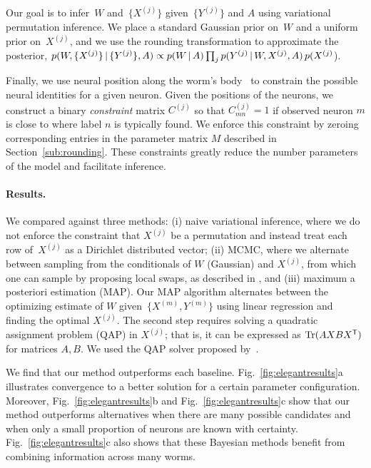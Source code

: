\documentclass[twoside]{article}
\begin{document}
Our goal is to infer~$W$ and~$\{X^{(j)}\}$ given~$\{Y^{(j)}\}$ and $A$ using
variational permutation inference.  We place a standard Gaussian prior
on~$W$ and a uniform prior on~$X^{(j)}$, and we use the rounding
transformation to approximate the posterior,
$p(W,\{X^{(j)}\} \, | \, \{Y^{(j)}\}, A)\propto p(W \, | \, A) \prod_j p(Y^{(j)}
\, | \, W, {X^{(j)}}, A) \, p({X^{(j)}}$).

Finally, we use neural position along the worm's body~\citep{wormatlas} to constrain the
possible neural identities for a given neuron.  Given the positions of the
neurons, we construct a binary \textit{constraint} matrix $C^{(j)}$
so that $C^{(j)}_{mn}=1$ if observed neuron $m$ is close to
where label $n$ is typically found. We enforce this constraint by
zeroing corresponding entries in the parameter matrix $M$ described in
Section~\ref{sub:rounding}.  These constraints greatly reduce the number
parameters of the model and facilitate inference.

\paragraph{Results.}
We compared against three methods: (i) naive
variational inference, where we do not enforce the constraint that
$X^{(j)}$ be a permutation and instead treat each row of~$X^{(j)}$ as
a Dirichlet distributed vector; (ii) MCMC, where we alternate between
sampling from the conditionals of $W$ (Gaussian) and ${X^{(j)}}$, from
which one can sample by proposing local swaps, as described in
\cite{Diaconis2009}, and (iii) maximum a posteriori estimation (MAP).
Our MAP algorithm alternates between the optimizing estimate of $W$
given~$\{X^{(m)}, Y^{(m)}\}$ using linear regression and finding the
optimal ${X^{(j)}}$. The second step requires solving a quadratic
assignment problem (QAP) in ${X^{(j)}}$; that is, it can be expressed
as $\mathrm{Tr}(AXBX^{\mathsf{T}})$ for matrices $A,B$. We used the QAP
solver proposed by~\citet{Vogelstein2015}.


We find that our method outperforms each
baseline. Fig.~\ref{fig:elegantresults}a illustrates convergence to a
better solution for a certain parameter configuration. Moreover,
Fig.~\ref{fig:elegantresults}b and Fig.~\ref{fig:elegantresults}c show
that our method outperforms alternatives when there are many possible
candidates and when only a small proportion of neurons are known with
certainty. Fig.~\ref{fig:elegantresults}c also shows that these
Bayesian methods benefit from combining information across many worms.
\end{document}
